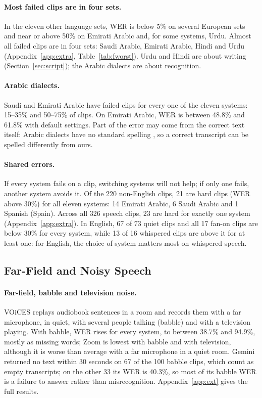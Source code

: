 \documentclass[11pt]{article}
\begin{document}
\paragraph{Most failed clips are in four sets.} In the eleven other language sets, WER is below 5\% on several European sets and near or above 50\% on Emirati Arabic and, for some systems, Urdu. Almost all failed clips are in four sets: Saudi Arabic, Emirati Arabic, Hindi and Urdu (Appendix~\ref{app:extra}, Table~\ref{tab:fworst}). Urdu and Hindi are about writing (Section~\ref{sec:script}); the Arabic dialects are about recognition.

\paragraph{Arabic dialects.} Saudi and Emirati Arabic have failed clips for every one of the eleven systems: 15--35\% and 50--75\% of clips. On Emirati Arabic, WER is between 48.8\% and 61.8\% with default settings. Part of the error may come from the correct text itself: Arabic dialects have no standard spelling \citep{habash2012coda}, so a correct transcript can be spelled differently from ours.

\paragraph{Shared errors.} If every system fails on a clip, switching systems will not help; if only one fails, another system avoids it. Of the 220 non-English clips, 21 are hard clips (WER above 30\%) for all eleven systems: 14 Emirati Arabic, 6 Saudi Arabic and 1 Spanish (Spain). Across all 326 speech clips, 23 are hard for exactly one system (Appendix~\ref{app:extra}). In English, 67 of 73 quiet clips and all 17 fan-on clips are below 30\% for every system, while 13 of 16 whispered clips are above it for at least one: for English, the choice of system matters most on whispered speech.

\subsection{Far-Field and Noisy Speech}\label{sec:voices}
\paragraph{Far-field, babble and television noise.} VOiCES \citep{richey2018voices} replays audiobook sentences in a room and records them with a far microphone, in quiet, with several people talking (babble) and with a television playing. With babble, WER rises for every system, to between 38.7\% and 94.9\%, mostly as missing words; Zoom is lowest with babble and with television, although it is worse than average with a far microphone in a quiet room. Gemini returned no text within 30 seconds on 67 of the 100 babble clips, which count as empty transcripts; on the other 33 its WER is 40.3\%, so most of its babble WER is a failure to answer rather than misrecognition. Appendix~\ref{app:ext} gives the full results.
\end{document}
